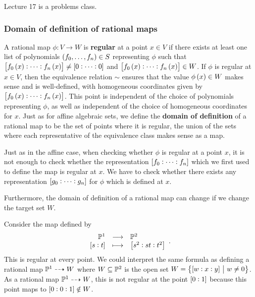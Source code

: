 Lecture 17 is a problems class.

\pagebreak

\subsubsection{Domain of definition of rational maps}


\begin{definition*}
A rational map $ \phi : V \to W $ is \textbf{regular} at a point $ x \in V $ if there exists at least one list of polynomials $ \br{f_0, \dots, f_n} \in S $ representing $ \phi $ such that $ \sbr{f_0\br{x} : \dots : f_n\br{x}} \ne \sbr{0 : \dots : 0} $ and $ \sbr{f_0\br{x} : \dots : f_n\br{x}} \in W $. If $ \phi $ is regular at $ x \in V $, then the equivalence relation $ \sim $ ensures that the value $ \phi\br{x} \in W $ makes sense and is well-defined, with homogeneous coordinates given by $ \sbr{f_0\br{x} : \dots : f_n\br{x}} $. This point is independent of the choice of polynomials representing $ \phi $, as well as independent of the choice of homogeneous coordinates for $ x $. Just as for affine algebraic sets, we define the \textbf{domain of definition} of a rational map to be the set of points where it is regular, the union of the sets where each representative of the equivalence class makes sense as a map.
\end{definition*}

\begin{note*}
Just as in the affine case, when checking whether $ \phi $ is regular at a point $ x $, it is not enough to check whether the representation $ \sbr{f_0 : \dots : f_n} $ which we first used to define the map is regular at $ x $. We have to check whether there exists any representation $ \sbr{g_0 : \dots : g_n} $ for $ \phi $ which is defined at $ x $.
\end{note*}

\begin{note*}
Furthermore, the domain of definition of a rational map can change if we change the target set $ W $.
\end{note*}

\begin{example*}
Consider the map defined by
$$ \function{\PP^1}{\PP^2}{\sbr{s : t}}{\sbr{s^2 : st : t^2}}. $$
This is regular at every point. We could interpret the same formula as defining a rational map $ \mathbb{P}^1 \dashrightarrow W $ where $ W \subseteq \mathbb{P}^2 $ is the open set $ W = \cbr{\sbr{w : x : y} \st w \ne 0} $. As a rational map $ \mathbb{P}^1 \dashrightarrow W $, this is not regular at the point $ \sbr{0 : 1} $ because this point maps to $ \sbr{0 : 0 : 1} \notin W $.
\end{example*}

